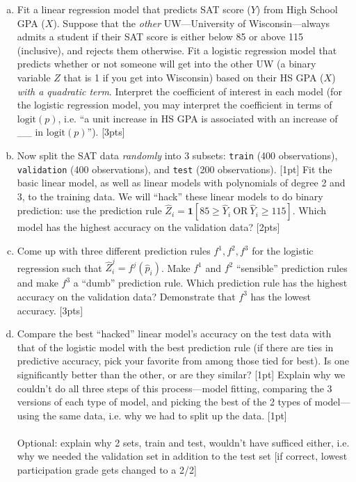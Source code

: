 \documentclass[12pt]{article}
\newcommand{\Ind}{\textbf{1}}
\newcommand{\logit}{\text{logit}}
\begin{document}
\begin{enumerate}[(a)]
	\item Fit a linear regression model that predicts SAT score ($Y$) from High School GPA ($X$). Suppose that the \textit{other} UW---University of Wisconsin---always admits a student if their SAT score is either below 85 or above 115 (inclusive), and rejects them otherwise. Fit a logistic regression model that predicts whether or not someone will get into the other UW (a binary variable $Z$ that is 1 if you get into Wisconsin) based on their HS GPA ($X$) \textit{with a quadratic term}. Interpret the coefficient of interest in each model (for the logistic regression model, you may interpret the coefficient in terms of $\logit(p)$, i.e. ``a unit increase in HS GPA is associated with an increase of \_\_ in $\logit(p)$''). [3pts]
	\item Now split the SAT data \textit{randomly} into 3 subsets: \verb|train| (400 observations), \verb|validation| (400 observations), and \verb|test| (200 observations). [1pt] Fit the basic linear model, as well as linear models with polynomials of degree 2 and 3, to the training data. We will ``hack'' these linear models to do binary prediction: use the prediction rule $\hat{Z}_i = \Ind[85 \ge \hat{Y}_i~\text{OR}~\hat{Y}_i \ge 115]$. Which model has the highest accuracy on the validation data? [2pts]
	\item Come up with three different prediction rules $f^1,f^2,f^3$ for the logistic regression such that $\hat{Z}_i^j = f^j(\hat{p}_i)$. Make $f^1$ and $f^2$ ``sensible'' prediction rules and make $f^3$ a ``dumb'' prediction rule. Which prediction rule has the highest accuracy on the validation data? Demonstrate that $f^3$ has the lowest accuracy. [3pts]
	\item Compare the best ``hacked'' linear model's accuracy on the test data with that of the logistic model with the best prediction rule (if there are ties in predictive accuracy, pick your favorite from among those tied for best). Is one significantly better than the other, or are they similar? [1pt] Explain why we couldn't do all three steps of this process---model fitting, comparing the 3 versions of each type of model, and picking the best of the 2 types of model---using the same data, i.e. why we had to split up the data. [1pt]\\\\ Optional: explain why 2 sets, train and test, wouldn't have sufficed either, i.e. why we needed the validation set in addition to the test set [if correct, lowest participation grade gets changed to a 2/2]
\end{enumerate}
\end{document}
